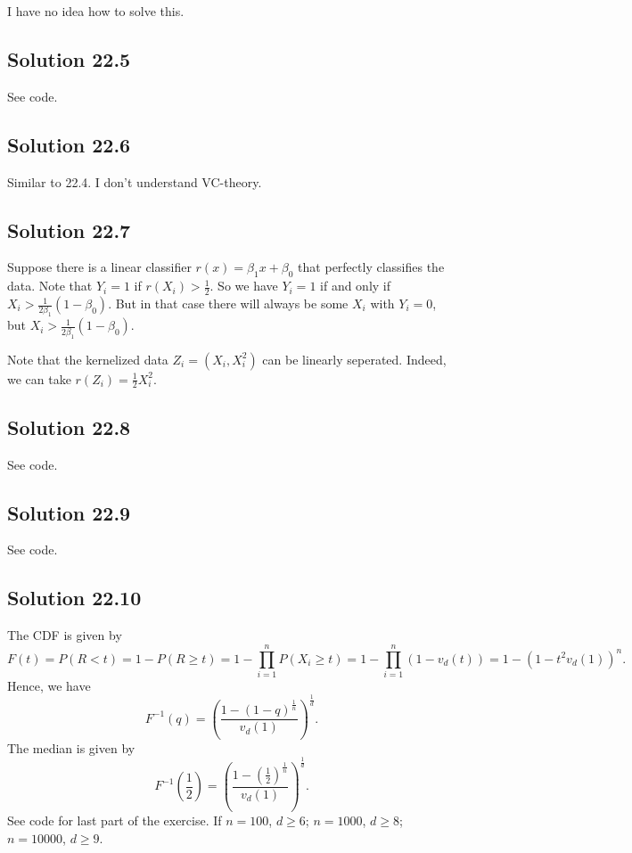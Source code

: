 I have no idea how to solve this.


\subsection*{Solution 22.5}

See code.


\subsection*{Solution 22.6}

Similar to 22.4. I don't understand VC-theory.


\subsection*{Solution 22.7}

Suppose there is a linear classifier $r(x) = \beta_1 x + \beta_0$ that perfectly classifies the data.
Note that $Y_i = 1$ if $r(X_i) > \frac{1}{2}$.
So we have $Y_i = 1$ if and only if $X_i > \frac{1}{2 \beta_1} (1 - \beta_0)$.
But in that case there will always be some $X_i$ with $Y_i = 0$, but $X_i > \frac{1}{2 \beta_1} (1 - \beta_0)$.

Note that the kernelized data $Z_i = (X_i, X_i^2)$ can be linearly seperated.
Indeed, we can take $r(Z_i) = \frac{1}{2} X_i^2$.


\subsection*{Solution 22.8}

See code.


\subsection*{Solution 22.9}

See code.


\subsection*{Solution 22.10}

The CDF is given by
\begin{equation*}
    F(t) = P(R < t)
        = 1 - P(R \geq t)
        = 1 - \prod_{i = 1}^n P(X_i \geq t)
        = 1 - \prod_{i = 1}^n (1 - v_d(t))
        = 1 - (1 - t^2 v_d(1))^n.
\end{equation*}
Hence, we have
\begin{equation*}
    F^{-1}(q) = \left(\frac{1 - (1 - q)^{\frac{1}{n}}}{v_d(1)}\right)^{\frac{1}{d}}.
\end{equation*}
The median is given by
\begin{equation*}
    F^{-1}\left(\frac{1}{2}\right) = \left(\frac{1 - (\frac{1}{2})^{\frac{1}{n}}}{v_d(1)}\right)^{\frac{1}{d}}.
\end{equation*}
See code for last part of the exercise.
If $n = 100$, $d \geq 6$; $n = 1000$, $d \geq 8$; $n = 10000$, $d \geq 9$.


